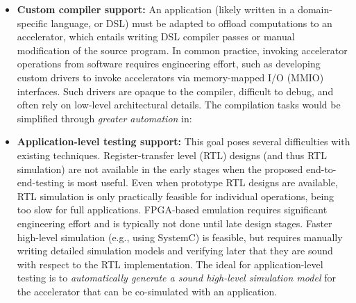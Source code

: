 \begin{itemize}
  \item {\bf Custom compiler support:}
  An application 
    (likely written in a domain-specific language, or DSL)
    must be adapted to offload computations to an accelerator,
    which entails writing DSL compiler passes
    or manual modification of the source program.
  In common practice,
    invoking accelerator operations from software
    requires engineering effort,
    such as developing custom drivers to invoke
    accelerators via memory-mapped I/O (MMIO) interfaces.
  Such drivers are opaque to the compiler,
    difficult to debug,
    and often rely on low-level architectural details.
  The compilation tasks would be simplified 
    through \emph{greater automation} in:

  \item {\bf Application-level testing support:}
  This goal poses several difficulties with existing techniques. 
  Register-transfer level (RTL) designs (and thus RTL simulation) are not available in the early stages when the proposed end-to-end-testing is most useful. Even when prototype RTL designs are available, RTL simulation is only practically feasible for individual operations, 
  being too slow for full applications.
  FPGA-based emulation requires significant engineering effort and is typically not done until late design stages. %
  Faster high-level simulation (e.g., using SystemC) is feasible,
  but requires manually writing detailed simulation models and
  verifying later that they are sound with respect to the RTL implementation.
  The ideal for application-level testing %
  is to \emph{automatically generate a sound high-level simulation model} for the accelerator that can be co-simulated with an application.
\end{itemize}


